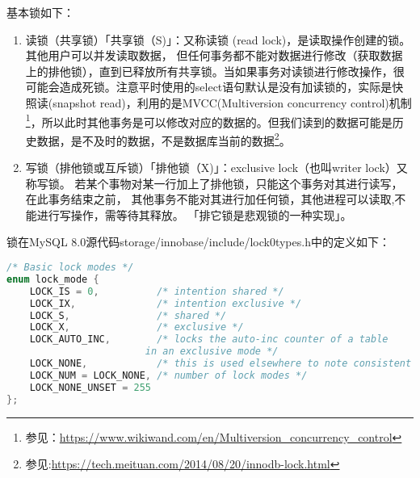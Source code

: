 \documentclass[../../../interview-questions.tex]{subfiles}
\begin{document}
基本锁如下：

\begin{enumerate}
    \item{读锁（共享锁）}「共享锁（S)」：又称读锁 (read lock)，是读取操作创建的锁。其他用户可以并发读取数据， 但任何事务都不能对数据进行修改（获取数据上的排他锁），直到已释放所有共享锁。当如果事务对读锁进行修改操作，很可能会造成死锁。注意平时使用的select语句默认是没有加读锁的，实际是快照读(snapshot read)，利用的是MVCC(Multiversion concurrency control)机制\footnote{参见：\url{https://www.wikiwand.com/en/Multiversion_concurrency_control}}，所以此时其他事务是可以修改对应的数据的。但我们读到的数据可能是历史数据，是不及时的数据，不是数据库当前的数据\footnote{参见:\url{https://tech.meituan.com/2014/08/20/innodb-lock.html}}。
    \item{写锁（排他锁或互斥锁）}「排他锁（X)」：exclusive lock（也叫writer lock）又称写锁。 若某个事物对某一行加上了排他锁，只能这个事务对其进行读写，在此事务结束之前， 其他事务不能对其进行加任何锁，其他进程可以读取,不能进行写操作，需等待其释放。 「排它锁是悲观锁的一种实现」。
\end{enumerate}

锁在MySQL 8.0源代码storage/innobase/include/lock0types.h中的定义如下：

\begin{lstlisting}[language=C]
/* Basic lock modes */
enum lock_mode {
    LOCK_IS = 0,          /* intention shared */
    LOCK_IX,              /* intention exclusive */
    LOCK_S,               /* shared */
    LOCK_X,               /* exclusive */
    LOCK_AUTO_INC,        /* locks the auto-inc counter of a table
                        in an exclusive mode */
    LOCK_NONE,            /* this is used elsewhere to note consistent read */
    LOCK_NUM = LOCK_NONE, /* number of lock modes */
    LOCK_NONE_UNSET = 255
};
\end{lstlisting}
\end{document}
